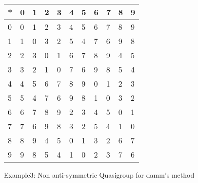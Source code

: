 \begin{figure}[htb]
 \begin{center}
\begin{tabular}{| l || l | l | l | l | l | l | l | l | l | l |}
 \hline
* & 0 & 1 & 2 & 3 & 4 & 5 & 6 & 7 & 8 & 9\\
\hline\hline
0 & 0 & 1 & 2 & 3 & 4 & 5 & 6 & 7 & 8 & 9\\
\hline
1 & 1 & 0 & 3 & 2 & 5 & 4 & 7 & 6 & 9 & 8\\
\hline
2 & 2 & 3 & 0 & 1 & 6 & 7 & 8 & 9 & 4 & 5\\
\hline
3 & 3 & 2 & 1 & 0 & 7 & 6 & 9 & 8 & 5 & 4\\
\hline
4 & 4 & 5 & 6 & 7 & 8 & 9 & 0 & 1 & 2 & 3\\
\hline
5 & 5 & 4 & 7 & 6 & 9 & 8 & 1 & 0 & 3 & 2\\
\hline
6 & 6 & 7 & 8 & 9 & 2 & 3 & 4 & 5 & 0 & 1\\
\hline
7 & 7 & 6 & 9 & 8 & 3 & 2 & 5 & 4 & 1 & 0\\
\hline
8 & 8 & 9 & 4 & 5 & 0 & 1 & 3 & 2 & 6 & 7\\
\hline
9 & 9 & 8 & 5 & 4 & 1 & 0 & 2 & 3 & 7 & 6\\
\hline
\end{tabular}
 \end{center}
\caption{Example3: Non anti-symmetric Quasigroup for damm's method}
\label{fig:10digitsQuasiNotdamm3}
\end{figure}